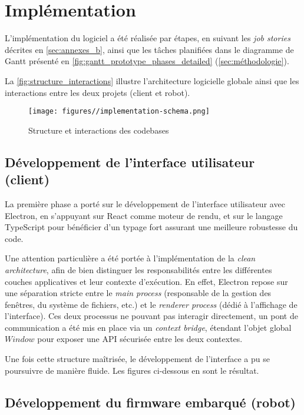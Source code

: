 \section{Implémentation}

L’implémentation du logiciel a été réalisée par étapes, en suivant les \textit{job stories} décrites en \autoref{sec:annexes_b}, ainsi que les tâches planifiées dans le diagramme de Gantt présenté en \autoref{fig:gantt_prototype_phases_detailed} (\autoref{sec:méthodologie}).

La \autoref{fig:structure_interactions} illustre l’architecture logicielle globale ainsi que les interactions entre les deux projets (client et robot).

\begin{figure}[H]
    \centering
    \texttt{[image: figures//implementation-schema.png]}
    \caption{\label{fig:structure_interactions} Structure et interactions des codebases}
\end{figure}

\subsection{Développement de l'interface utilisateur (client)}

La première phase a porté sur le développement de l’interface utilisateur avec Electron, en s’appuyant sur React comme moteur de rendu, et sur le langage TypeScript pour bénéficier d’un typage fort assurant une meilleure robustesse du code.

Une attention particulière a été portée à l’implémentation de la \textit{clean architecture}, afin de bien distinguer les responsabilités entre les différentes couches applicatives et leur contexte d’exécution.
En effet, Electron repose sur une séparation stricte entre le \textit{main process} (responsable de la gestion des fenêtres, du système de fichiers, etc.) et le \textit{renderer process} (dédié à l’affichage de l’interface).
Ces deux processus ne pouvant pas interagir directement, un pont de communication a été mis en place via un \textit{context bridge}, étendant l’objet global $Window$ pour exposer une API sécurisée entre les deux contextes.

Une fois cette structure maîtrisée, le développement de l’interface a pu se poursuivre de manière fluide.
Les figures ci-dessous en sont le résultat.


\subsection{Développement du firmware embarqué (robot)}

